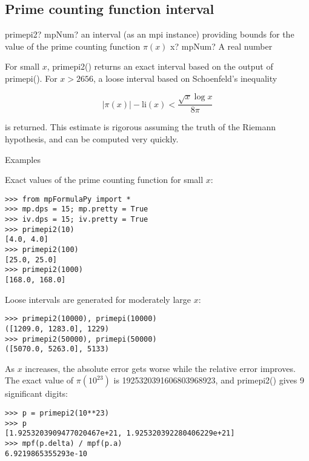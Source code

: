 \subsection{Prime counting function interval}

\begin{mpFunctionsExtract}
	\mpFunctionOne
	{primepi2? mpNum? an interval (as an mpi instance) providing bounds for the value of the prime counting function $\pi(x)$}
	{x? mpNum? A real number}	
\end{mpFunctionsExtract}

\vpara
For small $x$, primepi2() returns an exact interval based on the output of primepi(). For $x>2656$, a loose interval based on Schoenfeld's inequality

\begin{equation}
|\pi(x)|-\text{li}(x) < \frac{\sqrt{x}\log x}{8\pi}
\end{equation}

is returned. This estimate is rigorous assuming the truth of the Riemann hypothesis, and can be computed very quickly.

Examples

Exact values of the prime counting function for small $x$:

\begin{lstlisting}
>>> from mpFormulaPy import *
>>> mp.dps = 15; mp.pretty = True
>>> iv.dps = 15; iv.pretty = True
>>> primepi2(10)
[4.0, 4.0]
>>> primepi2(100)
[25.0, 25.0]
>>> primepi2(1000)
[168.0, 168.0]
\end{lstlisting}

Loose intervals are generated for moderately large $x$:

\begin{lstlisting}
>>> primepi2(10000), primepi(10000)
([1209.0, 1283.0], 1229)
>>> primepi2(50000), primepi(50000)
([5070.0, 5263.0], 5133)
\end{lstlisting}

As $x$ increases, the absolute error gets worse while the relative error improves. The exact value of $\pi(10^{23})$ is 1925320391606803968923, and primepi2() gives 9 significant digits:

\begin{lstlisting}
>>> p = primepi2(10**23)
>>> p
[1.9253203909477020467e+21, 1.925320392280406229e+21]
>>> mpf(p.delta) / mpf(p.a)
6.9219865355293e-10
\end{lstlisting}


